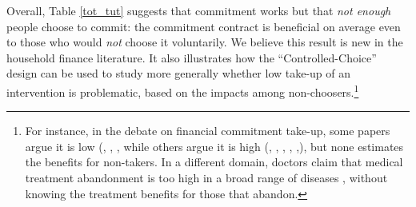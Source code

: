 \documentclass[11pt, a4paper]{article}
\begin{document}
Overall, Table \ref{tot_tut} suggests that commitment works but that \emph{not enough} people choose to commit: the commitment contract is beneficial on average even to those who would \emph{not} choose it voluntarily. We believe this result is new in the household finance literature. It also illustrates how the ``Controlled-Choice'' design can be used to study more generally whether low take-up of an intervention is problematic, based on the impacts among non-choosers.\footnote{For instance, in the debate on financial commitment take-up, some papers argue it is low (\cite{Ashraf}, \cite{Gine}, \cite{Ted}, \cite{Royer} while others argue it is high (\cite{Kremer}, \cite{Casaburi}, \cite{Alcohol}, \cite{AprajitP&P}, \cite{Pascaline},), but none estimates the benefits for non-takers. In a different domain, doctors claim that medical treatment abandonment is too high in a broad range of diseases \citep{non_adherence}, without knowing the treatment benefits for those that abandon.}



\end{document}
